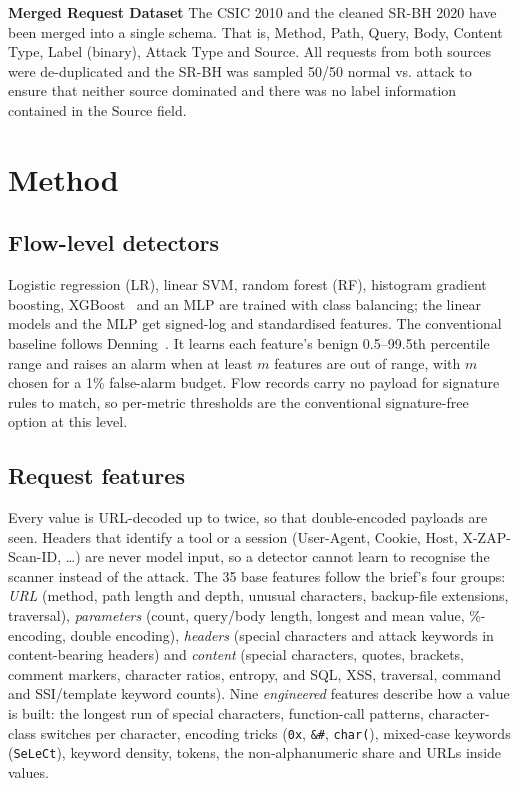 \documentclass[conference]{IEEEtran}
\begin{document}
\textbf{Merged Request Dataset} The CSIC 2010 and the cleaned SR-BH 2020 have been merged into a single schema. That is, Method, Path, Query, Body, Content Type, Label (binary), Attack Type and Source. All requests from both sources were de-duplicated and the SR-BH was sampled 50/50 normal vs. attack to ensure that neither source dominated and there was no label information contained in the Source field.


\section{Method}

\subsection{Flow-level detectors}

Logistic regression (LR), linear SVM, random forest (RF), histogram gradient boosting, XGBoost~\cite{xgboost} and an MLP are trained with class balancing; the linear models and the MLP get signed-log and standardised features. The conventional baseline follows Denning~\cite{denning1987}. It learns each feature's benign 0.5--99.5th percentile range and raises an alarm when at least $m$ features are out of range, with $m$ chosen for a 1\% false-alarm budget. Flow records carry no payload for signature rules to match, so per-metric thresholds are the conventional signature-free option at this level.

\subsection{Request features}

Every value is URL-decoded up to twice, so that double-encoded payloads are seen. Headers that identify a tool or a session (User-Agent, Cookie, Host, X-ZAP-Scan-ID, \dots) are never model input, so a detector cannot learn to recognise the scanner instead of the attack. The 35 base features follow the brief's four groups: \emph{URL} (method, path length and depth, unusual characters, backup-file extensions, traversal), \emph{parameters} (count, query/body length, longest and mean value, \%-encoding, double encoding), \emph{headers} (special characters and attack keywords in content-bearing headers) and \emph{content} (special characters, quotes, brackets, comment markers, character ratios, entropy, and SQL, XSS, traversal, command and SSI/template keyword counts). Nine \emph{engineered} features describe how a value is built: the longest run of special characters, function-call patterns, character-class switches per character, encoding tricks (\texttt{0x}, \texttt{\&\#}, \texttt{char(}), mixed-case keywords (\texttt{SeLeCt}), keyword density, tokens, the non-alphanumeric share and URLs inside values.
\end{document}
